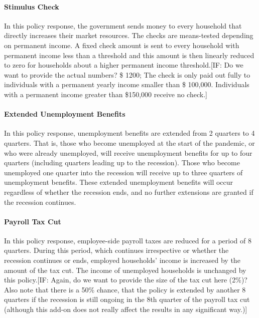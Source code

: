 \documentclass[../HAFiscal]{subfiles}
\begin{document}
	\paragraph{Stimulus Check} In this policy response, the government sends money to every household that directly increases their market resources. The checks are means-tested depending on permanent income. A fixed check amount is sent to every household with permanent income less than a threshold and this amount is then linearly reduced to zero for households about a higher permanent income threshold.[IF: Do we want to provide the actual numbers? \$ 1200; The check is only paid out fully to individuals with a permanent yearly income smaller than \$ 100,000. Individuals with a permanent income greater than \$150,000 receive no check.]
	
	\paragraph{Extended Unemployment Benefits} In this policy response, unemployment benefits are extended from 2 quarters to 4 quarters. That is, those who become unemployed at the start of the pandemic, or who were already unemployed, will receive unemployment benefits for up to four quarters (including quarters leading up to the recession). Those who become unemployed one quarter into the recession will receive up to three quarters of unemployment benefits. These extended unemployment benefits will occur regardless of whether the recession ends, and no further extensions are granted if the recession continues.
	
	\paragraph{Payroll Tax Cut} In this policy response, employee-side payroll taxes are reduced for a period of 8 quarters. During this period, which continues irrespective or whether the recession continues or ends, employed households' income is increased by the amount of the tax cut. The income of unemployed households is unchanged by this policy.[IF: Again, do we want to provide the size of the tax cut here (2\%)? Also note that there is a 50\% chance, that the policy is extended by another 8 quarters if the recession is still ongoing in the 8th quarter of the payroll tax cut (although this add-on does not really affect the results in any significant way.)]
	
\end{document}
